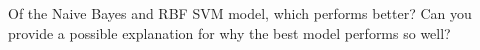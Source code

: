 \item
Of the Naive Bayes and RBF SVM model, which performs better? Can you provide a possible explanation for why the best model performs so well?

\ifnum{} {
  
} \fi

